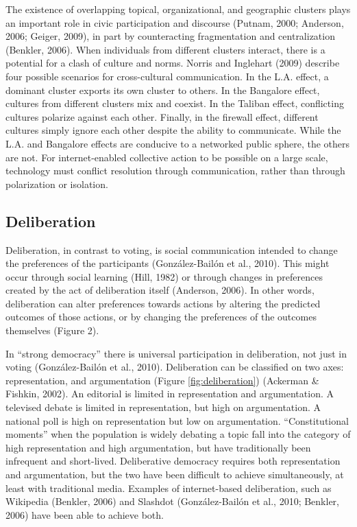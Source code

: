 The existence of overlapping topical, organizational, and geographic clusters plays an important role in civic participation and discourse (Putnam, 2000; Anderson, 2006; Geiger, 2009), in part by counteracting fragmentation and centralization (Benkler, 2006). When individuals from different clusters interact, there is a potential for a clash of culture and norms. Norris and Inglehart (2009) describe four possible scenarios for cross-cultural communication. In the L.A. effect, a dominant cluster exports its own cluster to others. In the Bangalore effect, cultures from different clusters mix and coexist. In the Taliban effect, conflicting cultures polarize against each other. Finally, in the firewall effect, different cultures simply ignore each other despite the ability to communicate. While the L.A. and Bangalore effects are conducive to a networked public sphere, the others are not. For internet-enabled collective action to be possible on a large scale, technology must conflict resolution through communication, rather than through polarization or isolation.

\subsection{Deliberation}
Deliberation, in contrast to voting, is social communication intended to change the preferences of the participants (Gonz\'alez-Bail\'on et al., 2010). This might occur through social learning (Hill, 1982) or through changes in preferences created by the act of deliberation itself (Anderson, 2006). In other words, deliberation can alter preferences towards actions by altering the predicted outcomes of those actions, or by changing the preferences of the outcomes themselves (Figure 2).

In ``strong democracy'' there is universal participation in deliberation, not just in voting (Gonz\'alez-Bail\'on et al., 2010). Deliberation can be classified on two axes: representation, and argumentation (Figure \ref{fig:deliberation}) (Ackerman \& Fishkin, 2002). An editorial is limited in representation and argumentation. A televised debate is limited in representation, but high on argumentation. A national poll is high on representation but low on argumentation. ``Constitutional moments'' when the population is widely debating a topic fall into the category of high representation and high argumentation, but have traditionally been infrequent and short-lived. Deliberative democracy requires both representation and argumentation, but the two have been difficult to achieve simultaneously, at least with traditional media. Examples of internet-based deliberation, such as Wikipedia (Benkler, 2006) and Slashdot (Gonz\'alez-Bail\'on et al., 2010; Benkler, 2006) have been able to achieve both.

